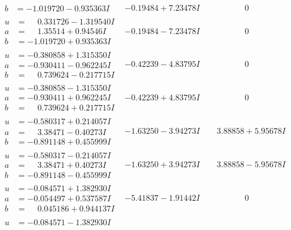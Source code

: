 \documentclass[1p]{elsarticle_modified}
\theoremstyle{definition}
\begin{document}
$$\begin{array}{c|c|c}
\begin{aligned}
b &= -1.019720 - 0.935363 I\end{aligned}
 & -0.19484 + 7.23478 I & \phantom{-0.000000 } 0 \\ \hline\begin{aligned}
u &= \phantom{-}0.331726 - 1.319540 I \\
a &= \phantom{-}1.35514 + 0.94546 I \\
b &= -1.019720 + 0.935363 I\end{aligned}
 & -0.19484 - 7.23478 I & \phantom{-0.000000 } 0 \\ \hline\begin{aligned}
u &= -0.380858 + 1.315350 I \\
a &= -0.930411 - 0.962245 I \\
b &= \phantom{-}0.739624 - 0.217715 I\end{aligned}
 & -0.42239 - 4.83795 I & \phantom{-0.000000 } 0 \\ \hline\begin{aligned}
u &= -0.380858 - 1.315350 I \\
a &= -0.930411 + 0.962245 I \\
b &= \phantom{-}0.739624 + 0.217715 I\end{aligned}
 & -0.42239 + 4.83795 I & \phantom{-0.000000 } 0 \\ \hline\begin{aligned}
u &= -0.580317 + 0.214057 I \\
a &= \phantom{-}3.38471 - 0.40273 I \\
b &= -0.891148 + 0.455999 I\end{aligned}
 & -1.63250 - 3.94273 I & \phantom{-}3.88858 + 5.95678 I \\ \hline\begin{aligned}
u &= -0.580317 - 0.214057 I \\
a &= \phantom{-}3.38471 + 0.40273 I \\
b &= -0.891148 - 0.455999 I\end{aligned}
 & -1.63250 + 3.94273 I & \phantom{-}3.88858 - 5.95678 I \\ \hline\begin{aligned}
u &= -0.084571 + 1.382930 I \\
a &= -0.054497 + 0.537587 I \\
b &= \phantom{-}0.045186 + 0.944137 I\end{aligned}
 & -5.41837 - 1.91442 I & \phantom{-0.000000 } 0 \\ \hline\begin{aligned}
u &= -0.084571 - 1.382930 I \\

\end{aligned}
\end{array}$$
\end{document}
